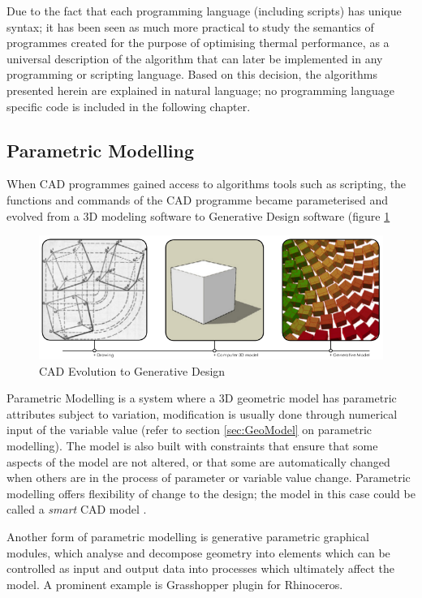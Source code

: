 Due to the fact that each programming language (including scripts) has unique syntax; it has been seen as much more practical to study the semantics of programmes created for the purpose of optimising thermal performance, as a universal description of the algorithm that can later be implemented in any programming or scripting language. Based on this decision, the algorithms presented herein are explained in natural language; no programming language specific code is included in the following chapter.

\subsection{Parametric Modelling}

When CAD programmes gained access to algorithms tools such as scripting, the functions and commands of the CAD programme became parameterised and evolved from a 3D modeling software to Generative Design software (figure \ref{fig:CADEvol}

\begin{figure}[h]
	\centering
	\includegraphics[width=\textwidth]{./Images/20-CADEvolution}
	\caption[CAD Evolution to Generative Design]{CAD Evolution to Generative Design \cite{khazabi12}}
	\label{fig:CADEvol}
\end{figure}

Parametric Modelling is a system where a 3D geometric model has parametric attributes subject to variation, modification is usually done through numerical input of the variable value (refer to section \ref{sec:GeoModel} on parametric modelling). The model is also built with constraints that ensure that some aspects of the model are not altered, or that some are automatically changed when others are in the process of parameter or variable value change. Parametric modelling offers flexibility of change to the design; the model in this case could be called a \emph{smart} CAD model \cite{kashyap01}.

Another form of parametric modelling is generative parametric graphical modules, which analyse and decompose geometry into elements which can be controlled as input and output data into processes which ultimately affect the model. A prominent example is Grasshopper plugin for Rhinoceros.

